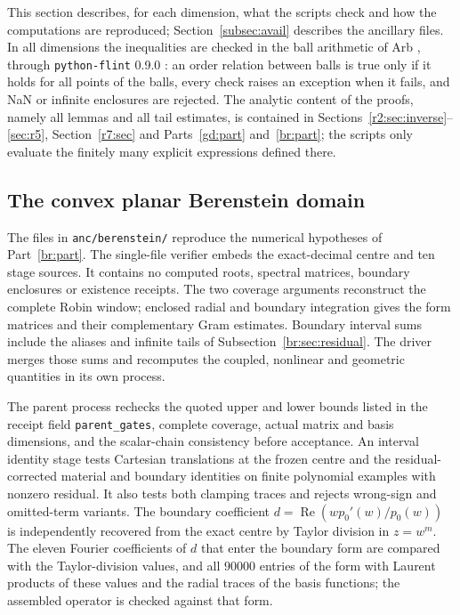\documentclass[11pt]{amsart}
\theoremstyle{definition}
\theoremstyle{remark}
\numberwithin{equation}{section}
\DeclareMathOperator{\re}{Re}
\begin{document}
This section describes, for each dimension, what the scripts check and how the computations are reproduced; Section~\ref{subsec:avail} describes the ancillary files. In all dimensions the inequalities are checked in the ball arithmetic of Arb \cite{Joh17}, through \texttt{python-flint} 0.9.0 \cite{flint}: an order relation between balls is true only if it holds for all points of the balls, every check raises an exception when it fails, and NaN or infinite enclosures are rejected. The analytic content of the proofs, namely all lemmas and all tail estimates, is contained in Sections~\ref{r2:sec:inverse}--\ref{sec:r5}, Section~\ref{r7:sec} and Parts~\ref{gd:part} and~\ref{br:part}; the scripts only evaluate the finitely many explicit expressions defined there.



\subsection{The convex planar Berenstein domain}\label{br:sec:verification}
The files in \texttt{anc/berenstein/} reproduce the numerical hypotheses of
Part~\ref{br:part}. The single-file verifier
 embeds the exact-decimal centre
and ten stage sources. It contains no computed roots, spectral matrices,
boundary enclosures or existence receipts. The two coverage arguments
reconstruct the complete Robin window; enclosed radial and boundary
integration gives the form matrices and their complementary Gram estimates.
Boundary interval sums include the aliases and infinite tails of
Subsection~\ref{br:sec:residual}. The driver merges those sums and recomputes
the coupled, nonlinear and geometric quantities in its own process.

The parent process rechecks the quoted upper and lower bounds listed in the
receipt field \texttt{parent\_gates}, complete coverage, actual matrix and
basis dimensions, and the scalar-chain consistency before acceptance. An interval identity stage tests Cartesian translations at the
frozen centre and the residual-corrected material and boundary identities
on finite polynomial examples with nonzero residual. It also tests both
clamping traces and rejects wrong-sign and omitted-term variants.
The boundary coefficient $d=\re(wp_0'(w)/p_0(w))$ is independently
recovered from the exact centre by Taylor division in $z=w^m$.
The eleven Fourier coefficients of $d$ that enter the boundary form are
compared with the Taylor-division values, and all $90000$ entries of the
form with Laurent products of these values and the radial traces of the
basis functions; the assembled operator is checked against that form.
\end{document}

